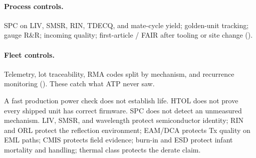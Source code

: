 \paragraph{Process controls.}
SPC on LIV, SMSR, RIN, TDECQ, and mate-cycle yield; golden-unit tracking; gauge
R\&R; incoming quality; first-article / FAIR after tooling or site change
().

\paragraph{Fleet controls.}
Telemetry, lot traceability, RMA codes split by mechanism, and recurrence
monitoring (). These catch what ATP never saw.

A fast production power check does not establish life. HTOL does not prove every
shipped unit has correct firmware. SPC does not detect an unmeasured mechanism.
LIV, SMSR, and wavelength protect semiconductor identity; RIN and ORL protect
the reflection environment; EAM/DCA protects Tx quality on EML paths; CMIS
protects field evidence; burn-in and ESD protect infant mortality and handling;
thermal class protects the derate claim.

